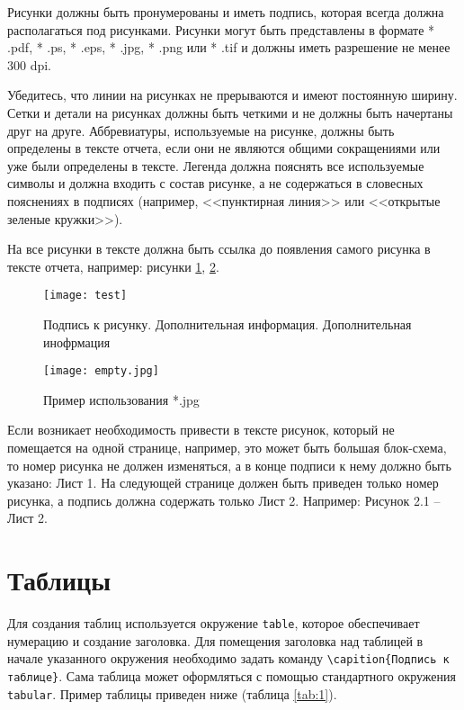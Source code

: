 Рисунки должны быть пронумерованы и иметь подпись, которая всегда должна располагаться 
под рисунками. Рисунки могут быть представлены в формате * .pdf, * .ps, * .eps, * .jpg, 
* .png или * .tif и должны иметь разрешение не менее 300 dpi. 

Убедитесь, что линии на рисунках не прерываются и имеют постоянную ширину. Сетки и детали
на рисунках должны быть четкими и не должны быть начертаны друг на друге. Аббревиатуры, 
используемые на рисунке, должны быть определены в тексте отчета, если они не являются общими сокращениями или уже были определены в тексте. Легенда должна пояснять все используемые символы и должна входить с состав рисунке, а не содержаться в словесных пояснениях в подписях (например, <<пунктирная линия>> или <<открытые зеленые кружки>>).

На все рисунки в тексте должна быть ссылка до появления самого рисунка в тексте отчета, например: рисунки \ref{fig:01}, \ref{fig:02}.

\begin{figure}[h!]
\begin{center}
\texttt{[image: test]}\\[2mm]
\caption{Подпись к рисунку. Дополнительная информация. Дополнительная инофрмация}\label{fig:01}
\end{center}
\end{figure}

\begin{figure}[h!]
\begin{center}
\texttt{[image: empty.jpg]}\\[2mm]
\caption{Пример использования *.jpg}\label{fig:02}
\end{center}
\end{figure}

Если возникает необходимость привести в тексте рисунок, который не помещается на одной странице, например, это может быть большая блок-схема, то номер рисунка не должен изменяться, а в конце подписи к нему должно быть указано: Лист 1. На следующей странице должен быть приведен только номер рисунка, а подпись должна содержать только Лист 2.
Например: Рисунок 2.1 -- Лист 2.


\section{Таблицы}

Для создания таблиц используется окружение \verb|table|, которое обеспечивает 
нумерацию и создание заголовка. Для помещения заголовка над
таблицей в начале указанного окружения необходимо задать команду
\verb|\capition{Подпись к таблице}|. Сама таблица может оформляться с помощью стандартного окружения \verb|tabular|. Пример таблицы приведен ниже (таблица \ref{tab:1}). 

